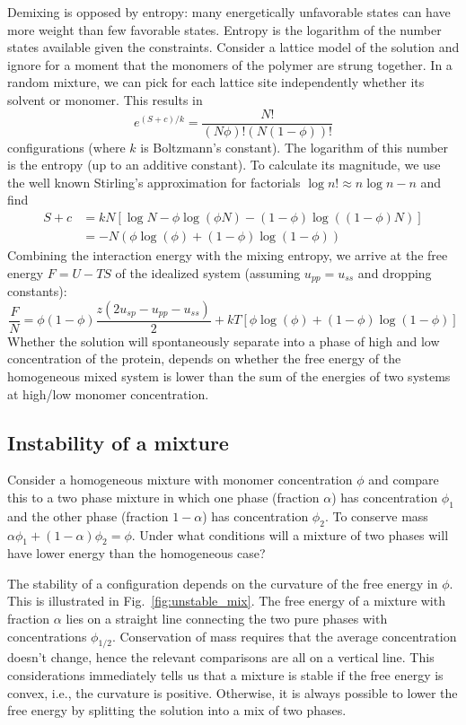 Demixing is opposed by entropy: many energetically unfavorable states can have more weight than few favorable states.
Entropy is the logarithm of the number states available given the constraints.
Consider a lattice model of the solution and ignore for a moment that the monomers of the polymer are strung together.
In a random mixture, we can pick for each lattice site independently whether its solvent or monomer.
This results in
\begin{equation}
e^{(S+c)/k} = \frac{N!}{(N\phi)!(N(1-\phi))!}
\end{equation}
configurations (where $k$ is Boltzmann's constant).
The logarithm of this number is the entropy (up to an additive constant).
To calculate its magnitude, we use the well known Stirling's approximation for factorials $\log n! \approx n\log n - n$ and find
\begin{equation}
\begin{split}
S + c &= kN\left[\log N - \phi\log(\phi N) - (1-\phi)\log((1-\phi)N)\right] \\
& = -N(\phi\log(\phi) + (1-\phi)\log(1-\phi))
\end{split}
\end{equation}
Combining the interaction energy with the mixing entropy, we arrive at the free energy $F=U-TS$ of the idealized system (assuming $u_{pp}=u_{ss}$ and dropping constants):
\begin{equation}
\frac{F}{N} =  \phi(1-\phi) \frac{z(2u_{sp} - u_{pp}-u_{ss})}{2} + kT\left[\phi\log(\phi) + (1-\phi)\log(1-\phi)\right]
\end{equation}
Whether the solution will spontaneously separate into a phase of high and low concentration of the protein, depends on whether the free energy of the homogeneous mixed system is lower than the sum of the energies of two systems at high/low monomer concentration.


\subsection*{Instability of a mixture}
Consider a homogeneous mixture with monomer concentration $\phi$ and compare this to a two phase mixture in which one phase (fraction $\alpha$) has concentration $\phi_1$ and the other phase (fraction $1-\alpha$) has concentration $\phi_2$.
To conserve mass $\alpha \phi_1 + (1-\alpha)\phi_2 = \phi$.
Under what conditions will a mixture of two phases will have lower energy than the homogeneous case?

The stability of a configuration depends on the curvature of the free energy in $\phi$.
This is illustrated in Fig.~\ref{fig:unstable_mix}.
The free energy of a mixture with fraction $\alpha$ lies on a straight line connecting the two pure phases with concentrations $\phi_{1/2}$.
Conservation of mass requires that the average concentration doesn't change, hence the relevant comparisons are all on a vertical line.
This considerations immediately tells us that a mixture is stable if the free energy is convex, i.e., the curvature is positive.
Otherwise, it is always possible to lower the free energy by splitting the solution into a mix of two phases.

